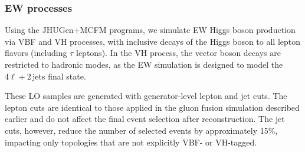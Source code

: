 \subsubsection{EW processes}


Using the JHUGen+MCFM programs, we simulate EW Higgs boson production via VBF and VH processes, with inclusive decays of the Higgs boson to all lepton flavors (including $\tau$ leptons). In the VH process, the vector boson decays are restricted to hadronic modes, as the EW simulation is designed to model the $4\ell + 2$\,jets final state.

These LO samples are generated with generator-level lepton and jet cuts. The lepton cuts are identical to those applied in the gluon fusion simulation described earlier and do not affect the final event selection after reconstruction. The jet cuts, however, reduce the number of selected events by approximately 15\%, impacting only topologies that are not explicitly VBF- or VH-tagged.

